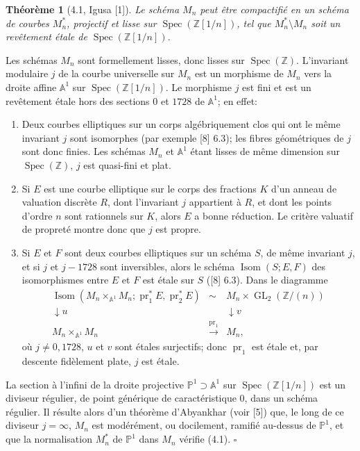 \documentclass[10pt]{article}
\newcommand{\Z}{\mathbb Z}
\newcommand{\GL}{\operatorname{GL}}
\newcommand{\Isom}{\operatorname{Isom}}
\newcommand{\Spec}{\operatorname{Spec}}
\newcommand{\QED}{\hfill$\square$}
\newtheorem*{theorem}{Théorème}
\begin{document}
\begin{theorem}[4.1, Igusa {\rm [1]}]
Le schéma $M_n$ peut être compactifié en un schéma de courbes $M_n^*$, projectif et lisse sur $\Spec(\Z[1/n])$, tel que $M_n^*\setminus M_n$ soit un revêtement étale de $\Spec(\Z[1/n])$.
\end{theorem}

Les schémas $M_n$ sont formellement lisses, donc lisses sur $\Spec(\Z)$. L'invariant modulaire $j$ de la courbe universelle sur $M_n$ est un morphisme de $M_n$ vers la droite affine $\mathbb A^1$ sur $\Spec(\Z[1/n])$. Le morphisme $j$ est fini et est un revêtement étale hors des sections $0$ et $1728$ de $\mathbb A^1$; en effet:
\begin{enumerate}[label=(\alph*)]
\item Deux courbes elliptiques sur un corps algébriquement clos qui ont le même invariant $j$ sont isomorphes (par exemple [8] 6.3); les fibres géométriques de $j$ sont donc finies. Les schémas $M_n$ et $\mathbb A^1$ étant lisses de même dimension sur $\Spec(\Z)$, $j$ est quasi-fini et plat.
\item Si $E$ est une courbe elliptique sur le corps des fractions $K$ d'un anneau de valuation discrète $R$, dont l'invariant $j$ appartient à $R$, et dont les points d'ordre $n$ sont rationnels sur $K$, alors $E$ a bonne réduction. Le critère valuatif de propreté montre donc que $j$ est propre.
\item Si $E$ et $F$ sont deux courbes elliptiques sur un schéma $S$, de même invariant $j$, et si $j$ et $j-1728$ sont inversibles, alors le schéma $\Isom(S;E,F)$ des isomorphismes entre $E$ et $F$ est étale sur $S$ ([8] 6.3). Dans le diagramme
\[
\begin{array}{ccc}
\Isom(M_n\times_{\mathbb A^1}M_n;\operatorname{pr}_1^*E,\operatorname{pr}_2^*E) & \sim & M_n\times\GL_2(\Z/(n))\\
\downarrow u && \downarrow v\\
M_n\times_{\mathbb A^1}M_n&\xrightarrow{\operatorname{pr}_1}&M_n,
\end{array}
\]
où $j\ne0,1728$, $u$ et $v$ sont étales surjectifs; donc $\operatorname{pr}_1$ est étale et, par descente fidèlement plate, $j$ est étale.
\end{enumerate}
La section à l'infini de la droite projective $\mathbb P^1\supset\mathbb A^1$ sur $\Spec(\Z[1/n])$ est un diviseur régulier, de point générique de caractéristique $0$, dans un schéma régulier. Il résulte alors d'un théorème d'Abyankhar (voir [5]) que, le long de ce diviseur $j=\infty$, $M_n$ est modérément, ou docilement, ramifié au-dessus de $\mathbb P^1$, et que la normalisation $M_n^*$ de $\mathbb P^1$ dans $M_n$ vérifie (4.1). \QED
\end{document}
